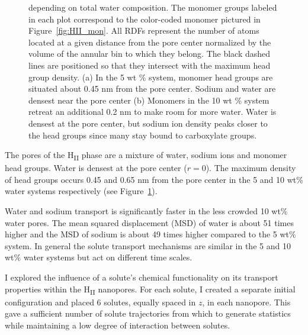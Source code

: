 \documentclass{article}
\begin{document}
\begin{figure}
{  depending on total water composition. The monomer groups labeled in each plot correspond to
  the color-coded monomer pictured in Figure~\ref{fig:HII_mon}. All RDFs
  represent the number of atoms located at a given distance from the pore center
  normalized by the volume of the annular bin to which they belong. The black
  dashed lines are positioned so that they intersect with the maximum head group
  density. (a) In the 5 wt \% system, monomer head groups are situated about 0.45 nm
  from the pore center. Sodium and water are densest near the pore center 
  (b) Monomers in the 10 wt \% system retreat an additional 0.2 nm to make room
  for more water. Water is densest at the pore center, but sodium ion density
  peaks closer to the head groups since many stay bound to carboxylate groups.}\label{fig:component_densities}
  \end{figure}
  
  The pores of the H\textsubscript{II} phase are a mixture of water, sodium
  ions and monomer head groups. Water is densest at the pore center ($r = 0$).
  The maximum density of head groups occurs 0.45 and 0.65 nm from the pore 
  center in the 5 and 10 wt\% water systems respectively (see 
  Figure~\ref{fig:component_densities}).
    
  Water and sodium transport is significantly faster in the less crowded 
  10 wt\% water pores. The mean squared displacement (MSD) of water is about
  51 times higher and the MSD of sodium is about 49 times higher compared to
  the 5 wt\% system. In general the solute transport mechanisms are similar
  in the 5 and 10 wt\% water systems but act on different time scales.
  
  I explored the influence of a solute's chemical functionality on its 
  transport properties within the H\textsubscript{II} nanopores.
  For each solute, I created a separate initial configuration and placed 6 
  solutes, equally spaced in $z$, in each nanopore. This gave a sufficient
  number of solute trajectories from which to generate statistics while 
  maintaining a low degree of interaction between solutes. 
  
\end{document}
